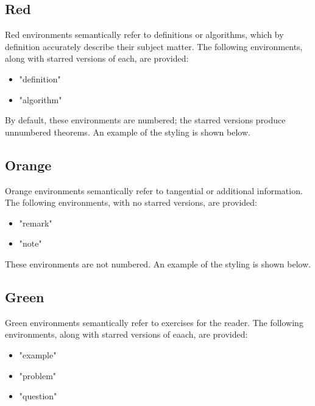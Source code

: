 \documentclass{l3doc}
\begin{document}
\begin{theorem*}
  \lipsum[1][1-6]
\end{theorem*}

\subsection{Red}

Red environments semantically refer to definitions or algorithms, which by definition accurately describe their subject matter. The following environments, along with starred versions of each, are provided: \begin{itemize}
  \item "definition"
  \item "algorithm"
\end{itemize}

By default, these environments are numbered; the starred versions produce unnumbered theorems. An example of the styling is shown below.

\begin{definition*}
  \lipsum[1][1-6]
\end{definition*}

\subsection{Orange}

Orange environments semantically refer to tangential or additional information. The following environments, with no starred versions, are provided: \begin{itemize}
  \item "remark"
  \item "note"
\end{itemize}

These environments are not numbered. An example of the styling is shown below.

\begin{remark}
  \lipsum[1][1-6]
\end{remark}

\subsection{Green}

Green environments semantically refer to exercises for the reader. The following environments, along with starred versions of eaach, are provided: \begin{itemize}
  \item "example"
  \item "problem"
  \item "question"
\end{itemize}
\end{document}
